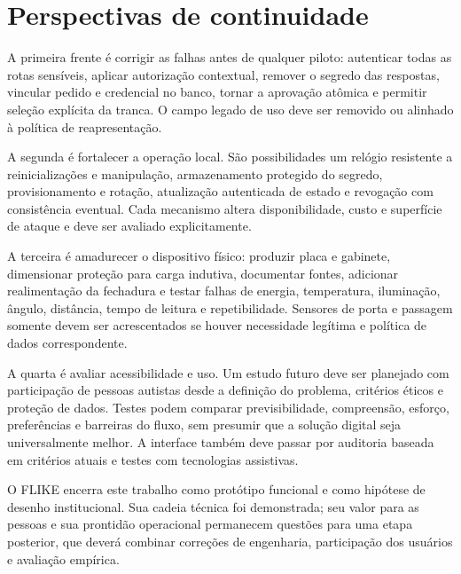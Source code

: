 \section{Perspectivas de continuidade}

A primeira frente é corrigir as falhas antes de qualquer piloto: autenticar todas as rotas sensíveis, aplicar autorização contextual, remover o segredo das respostas, vincular pedido e credencial no banco, tornar a aprovação atômica e permitir seleção explícita da tranca. O campo legado de uso deve ser removido ou alinhado à política de reapresentação.

A segunda é fortalecer a operação local. São possibilidades um relógio resistente a reinicializações e manipulação, armazenamento protegido do segredo, provisionamento e rotação, atualização autenticada de estado e revogação com consistência eventual. Cada mecanismo altera disponibilidade, custo e superfície de ataque e deve ser avaliado explicitamente.

A terceira é amadurecer o dispositivo físico: produzir placa e gabinete, dimensionar proteção para carga indutiva, documentar fontes, adicionar realimentação da fechadura e testar falhas de energia, temperatura, iluminação, ângulo, distância, tempo de leitura e repetibilidade. Sensores de porta e passagem somente devem ser acrescentados se houver necessidade legítima e política de dados correspondente.

A quarta é avaliar acessibilidade e uso. Um estudo futuro deve ser planejado com participação de pessoas autistas desde a definição do problema, critérios éticos e proteção de dados. Testes podem comparar previsibilidade, compreensão, esforço, preferências e barreiras do fluxo, sem presumir que a solução digital seja universalmente melhor. A interface também deve passar por auditoria baseada em critérios atuais e testes com tecnologias assistivas.

O FLIKE encerra este trabalho como protótipo funcional e como hipótese de desenho institucional. Sua cadeia técnica foi demonstrada; seu valor para as pessoas e sua prontidão operacional permanecem questões para uma etapa posterior, que deverá combinar correções de engenharia, participação dos usuários e avaliação empírica.
